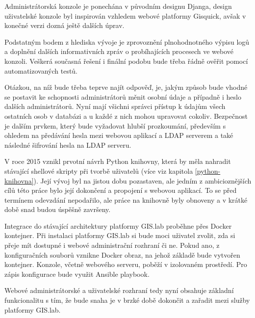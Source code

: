 Administrátorská konzole je ponechána v původním designu Djanga,
design uživatelské konzole byl inspirován vzhledem webové platformy
Gisquick, avšak v konečné verzi dozná ještě dalších úprav.

Podstatným bodem z hlediska vývoje je zprovoznění plnohodnotného
výpisu logů a doplnění dalších informativních zpráv o probíhajících
procesech ve webové konzoli. Veškerá současná řešení i finální podobu
bude třeba řádně ověřit pomocí automatizovaných testů.

Otázkou, na níž bude třeba teprve najít odpověď, je, jakým způsob bude
vhodné se postavit ke schopnosti administrátorů měnit osobní údaje a
případně i heslo dalších administrátorů. Nyní mají všichni správci
přístup k údajům všech ostatních osob v databázi a u každé z nich
mohou upravovat cokoliv. Bezpečnost je dalším prvkem, který bude
vyžadovat hlubší prozkoumání, především s ohledem na předávání hesla
mezi webovou aplikací a LDAP serverem a také následné šifrování hesla
na LDAP serveru.

V roce 2015 vznikl prvotní návrh Python knihovny, která by měla
nahradit stávající shellové skripty při tvorbě uživatelů (více viz
kapitola \ref{python-knihovna}). Její vývoj byl na jistou dobu
pozastaven, ale jedním z ambicioznějších cílů této práce bylo její
dokončení a propojení s webovou aplikací. To se před termínem
odevzdání nepodařilo, ale práce na knihovně byly obnoveny a v krátké
době snad budou úspěšně završeny.

Integrace do stávající architektury platformy GIS.lab proběhne přes
Docker kontejner. Při instalaci platformy GIS.lab si bude moci
uživatel zvolit, zda si přeje mít dostupné i webové administrační
rozhraní či ne. Pokud ano, z konfiguračních souborů vznikne Docker
obraz, na jehož základě bude vytvořen kontejner. Konzole, včetně
webového serveru, poběží v izolovaném prostředí. Pro zápis konfigurace
bude využit Ansible playbook.

Webové administrátorské a uživatelské rozhraní tedy nyní obsahuje
základní funkcionalitu s tím, že bude snaha je v brzké době dokončit a
zařadit mezi služby platformy GIS.lab.
